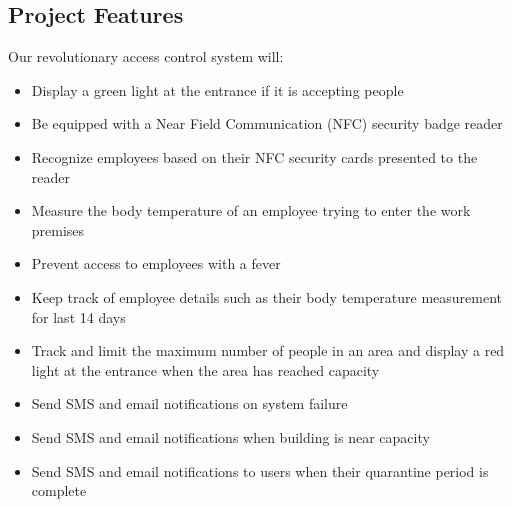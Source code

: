 \subsection{Project Features}

Our revolutionary access control system will:
\begin{itemize}
    \item Display a green light at the entrance if it is accepting people
    \item Be equipped with a Near Field Communication (NFC) security badge
          reader
    \item Recognize employees based on their NFC security cards presented to
          the reader 
    \item Measure the body temperature of an employee trying to enter the work
          premises 
    \item Prevent access to employees with a fever
    \item Keep track of employee details such as their body temperature
          measurement for last 14 days
    \item Track and limit the maximum number of people in an area and display a
          red light at the entrance when the area has reached capacity
    \item Send SMS and email notifications on system failure
    \item Send SMS and email notifications when building is near capacity
    \item Send SMS and email notifications to users when their
          quarantine period is complete
\end{itemize}

